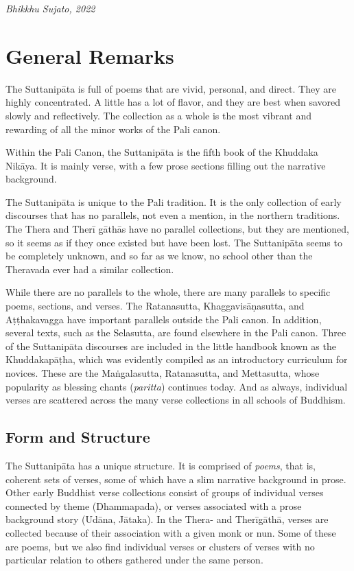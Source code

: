 \documentclass[12pt,openany]{book}%
\newcommand*{\scbyline}[1]{\begin{flushright}\textit{#1}\end{flushright}\bigskip}
\begin{document}
\scbyline{Bhikkhu Sujato, 2022}

\section*{General Remarks}

The \textsanskrit{Suttanipāta} is full of poems that are vivid, personal, and direct. They are highly concentrated. A little has a lot of flavor, and they are best when savored slowly and reflectively. The collection as a whole is the most vibrant and rewarding of all the minor works of the Pali canon.

Within the Pali Canon, the \textsanskrit{Suttanipāta} is the fifth book of the Khuddaka \textsanskrit{Nikāya}. It is mainly verse, with a few prose sections filling out the narrative background.

The \textsanskrit{Suttanipāta} is unique to the Pali tradition. It is the only collection of early discourses that has no parallels, not even a mention, in the northern traditions. The Thera and \textsanskrit{Therī} \textsanskrit{gāthās} have no parallel collections, but they are mentioned, so it seems as if they once existed but have been lost. The \textsanskrit{Suttanipāta} seems to be completely unknown, and so far as we know, no school other than the Theravada ever had a similar collection.

While there are no parallels to the whole, there are many parallels to specific poems, sections, and verses. The Ratanasutta, \textsanskrit{Khaggavisāṇasutta}, and \textsanskrit{Aṭṭhakavagga} have important parallels outside the Pali canon. In addition, several texts, such as the Selasutta, are found elsewhere in the Pali canon. Three of the \textsanskrit{Suttanipāta} discourses are included in the little handbook known as the \textsanskrit{Khuddakapāṭha}, which was evidently compiled as an introductory curriculum for novices. These are the \textsanskrit{Maṅgalasutta}, Ratanasutta, and Mettasutta, whose popularity as blessing chants (\textit{paritta}) continues today. And as always, individual verses are scattered across the many verse collections in all schools of Buddhism.

\subsection*{Form and Structure}

The \textsanskrit{Suttanipāta} has a unique structure. It is comprised of \emph{poems}, that is, coherent sets of verses, some of which have a slim narrative background in prose. Other early Buddhist verse collections consist of groups of individual verses connected by theme (Dhammapada), or verses associated with a prose background story (\textsanskrit{Udāna}, \textsanskrit{Jātaka}). In the Thera- and \textsanskrit{Therīgāthā}, verses are collected because of their association with a given monk or nun. Some of these are poems, but we also find individual verses or clusters of verses with no particular relation to others gathered under the same person.
\end{document}
